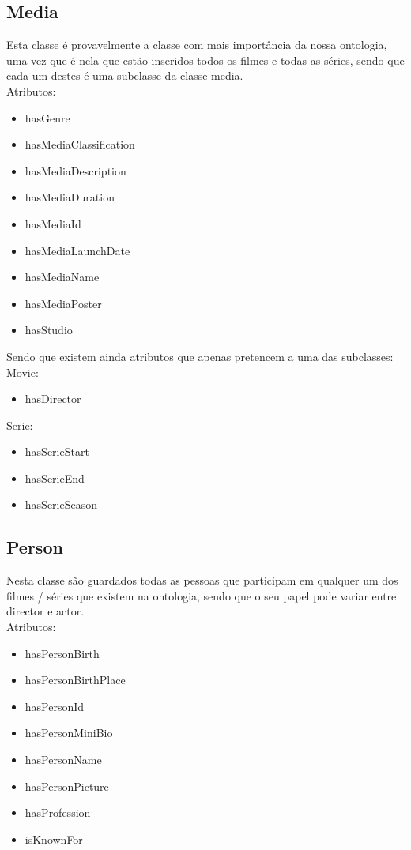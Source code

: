 \documentclass[a4paper]{article}
\begin{document}
\subsection{Media}
\indent \indent Esta classe é provavelmente a classe com mais importância da nossa ontologia, uma vez que é nela que estão inseridos todos os filmes e todas as séries, sendo que cada um destes é uma subclasse da classe media.\\
Atributos:
\begin{itemize}
	\item hasGenre
	\item hasMediaClassification
	\item hasMediaDescription
	\item hasMediaDuration
	\item hasMediaId
	\item hasMediaLaunchDate
	\item hasMediaName
	\item hasMediaPoster
	\item hasStudio
\end{itemize}

Sendo que existem ainda atributos que apenas pretencem a uma das subclasses:\\
Movie:
\begin{itemize}
	\item hasDirector
\end{itemize}
Serie:
\begin{itemize}
	\item hasSerieStart
	\item hasSerieEnd
	\item hasSerieSeason
\end{itemize}

\subsection{Person}
\indent \indent Nesta classe são guardados todas as pessoas que participam em qualquer um dos filmes / séries que existem na ontologia, sendo que o seu papel pode variar entre director e actor.\\
Atributos:
\begin{itemize}
	\item hasPersonBirth
	\item hasPersonBirthPlace
	\item hasPersonId
	\item hasPersonMiniBio
	\item hasPersonName
	\item hasPersonPicture
	\item hasProfession
	\item isKnownFor
\end{itemize}
\end{document}
